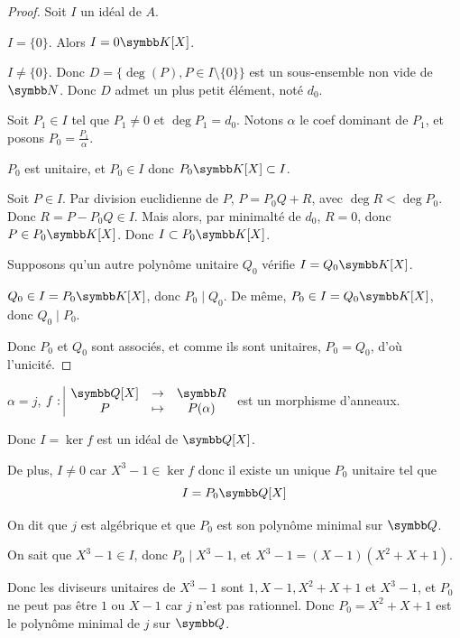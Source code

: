 \begin{proof}
    Soit $I$ un idéal de $A$. 

     $I = \{0\}$. Alors $I = 0 \K[X]$.

     $I \neq \{0\}$. Donc $D = \{\deg(P), P \in I \setminus \{0\}\}$ 
    est un sous-ensemble non vide de $\N$. Donc $D$ admet un plus petit élément, noté $d_0$.

    Soit $P_1 \in I$ tel que $P_1 \neq 0 $ et $\deg P_1 = d_0$. Notons $\alpha$ le coef dominant 
    de $P_1$, et posons $P_0 = \frac{P_1} \alpha$. 

    $P_0$ est unitaire, et $P_0 \in I$ donc $P_0 \K[X] \subset I$.

    \avspace Soit $P \in I$. Par division euclidienne de $P$, $P = P_0 Q + R$, avec 
    $\deg R < \deg P_0$. Donc $R = P - P_0 Q \in I$. Mais alors, par minimalté de $d_0$,
    $R = 0$, donc $P \in P_0 \K[X]$. Donc $I \subset P_0 \K[X]$.

    \lvspace Supposons qu'un autre polynôme unitaire $Q_0$ vérifie $I = Q_0 \K[X]$.

    $Q_0 \in I = P_0 \K[X]$, donc $P_0 \mid Q_0$. De même, $P_0 \in I = Q_0 \K[X]$, donc $Q_0 \mid P_0$.

    Donc $P_0$ et $Q_0$ sont associés, et comme ils sont unitaires, $P_0 = Q_0$, d'où l'unicité.
\end{proof}

\begin{exemple}
    $\alpha = j$, $\fonction f {\Q[X]}\R P {P(\alpha)}$ est un morphisme d'anneaux.

    Donc $I = \ker f$ est un idéal de $\Q[X]$.

    De plus, $I \neq 0$ car $X^3 - 1 \in \ker f$ donc il existe un unique $P_0$ unitaire
    tel que \[I = P_0 \Q[X]\]

    On dit que $j$ est algébrique et que $P_0$ est son polynôme minimal sur $\Q$.

    On sait que $X^3 - 1 \in I$, donc $P_0 \mid X^3 - 1$, et 
    $X^3 - 1 = (X - 1)(X^2 + X + 1)$. 

    Donc les diviseurs unitaires de $X^3 - 1$ sont $1, X - 1, X^2 + X + 1$ et $X^3 - 1$, et 
    $P_0$ ne peut pas être $1$ ou $X - 1$ car $j$ n'est pas rationnel. 
    Donc $P_0 = X^2 + X + 1$ est le polynôme minimal de $j$ sur $\Q$.


\end{exemple}

